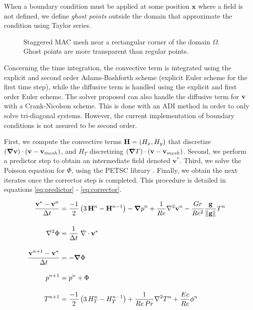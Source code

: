 \documentclass[11 pt]{article}
\begin{document}
When a boundary condition must be applied at some position $\mathbf{x}$ where a field is not defined, we define \textit{ghost points} outside the domain that approximate the condition using Taylor series.

\begin{figure}[H]
    \centering
    
    \caption{Staggered MAC mesh near a rectangular corner of the domain $\Omega$. Ghost points are more transparent than regular points.}
    \label{fig:macMesh}
\end{figure}


Concerning the time integration, the convective term is integrated using the explicit and second order Adams-Bashforth scheme (explicit Euler scheme for the first time step), while the diffusive term is handled using the explicit and first order Euler scheme. The solver proposed can also handle the diffusive term for $\mathbf{v}$ with a Crank-Nicolson scheme. This is done with an ADI method in order to only solve tri-diagonal systems. However, the current implementation of boundary conditions is not assured to be second order.

First, we compute the convective terms $\mathbf{H} = (H_x, H_y)$ that discretize $(\boldsymbol\nabla \mathbf{v}) \cdot (\mathbf{v} - \mathbf{v}_{mesh})$, and $H_T$ discretizing $(\boldsymbol \nabla T) \cdot (\mathbf{v} - \mathbf{v}_{mesh})$. Second, we perform a predictor step to obtain an intermediate field denoted $\mathbf{v}^*$. Third, we solve the Poisson equation for $\Phi$, using the PETSC library \cite{petsc-efficient}. 
Finally, we obtain the next iterates once the corrector step is completed. This procedure is detailed in equations \eqref{eq:predictor} - \eqref{eq:corrector}.

\begin{align}
    \frac{\mathbf{v}^* - \mathbf{v}^n}{\Delta t} &= \frac{-1}{2} \left(3\,\mathbf{H}^n - \mathbf{H}^{n-1}\right) - \boldsymbol{\nabla} p^n + \frac{1}{Re} \nabla^2 \mathbf{v}^n - \frac{Gr}{Re^2} \frac{\mathbf{g}}{\left\|\mathbf{g}\right\|} T^n \label{eq:predictor} \\[10pt]
    \nabla^2\Phi &= \frac{1}{\Delta t} \; \nabla \cdot \mathbf{v}^*\\[10pt]
    \frac{\mathbf{v}^{n+1} - \mathbf{v}^*}{\Delta t} &= -\boldsymbol{\nabla} \Phi\\[10pt]
    p^{n+1} &= p^n + \Phi\\[10pt]
    T^{n+1} &= \frac{-1}{2} \left(3\, H_T^n - H_T^{n-1}\right) + \frac{1}{Re\, Pr} \nabla^2 T^n + \frac{Ec}{Re} \phi^n \label{eq:corrector}
\end{align}
\end{document}

